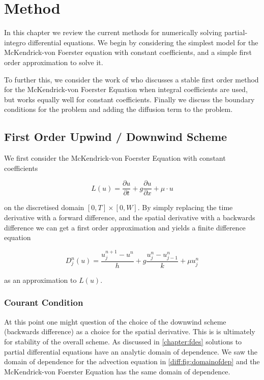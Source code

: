 \documentclass[../main.tex]{subfiles}
\begin{document}
  \chapter{Method}\label{chapter:method}

  In this chapter we review the current methods for numerically solving partial-integro differential equations. We begin by considering the simplest model for the McKendrick-von Foerster equation with constant coefficients, and a simple first order approximation to solve it.

  To further this, we consider the work of \cite{hartvig2011} who discusses a stable first order method for the McKendrick-von Foerster Equation when integral coefficients are used, but works equally well for constant coefficients. Finally we discuss the boundary conditions for the problem and adding the diffusion term to the problem.

  \section{First Order Upwind / Downwind Scheme}
  We first consider the McKendrick-von Foerster Equation with constant coefficients

  \begin{equation}
    L(u) = \frac{\partial u}{\partial t} + g \frac{\partial u}{\partial x} + \mu \cdot u
  \end{equation}

  on the discretised domain $[0, T] \times [0, W]$. By simply replacing the time derivative with a forward difference, and the spatial derivative with a backwards difference we can get a first order approximation and yields a finite difference equation

  \begin{equation}
    D^n_j(u) = \frac{u^{n+1}_j - u^n}{h} + g \frac{u^n_{j} - u^n_{j-1}}{k} + \mu u^n_j
  \end{equation}

  as an approximation to $L(u)$.

  \subsection{Courant Condition}
  At this point one might question of the choice of the downwind scheme (backwards difference) as a choice for the spatial derivative. This is is ultimately for stability of the overall scheme. As discussed in \autoref{chapter:fdes} solutions to partial differential equations have an analytic domain of dependence. We saw the domain of dependence for the advection equation in \autoref{diff:fig:domainofdep} and the McKendrick-von Foerster Equation has the same domain of dependence.
\end{document}
